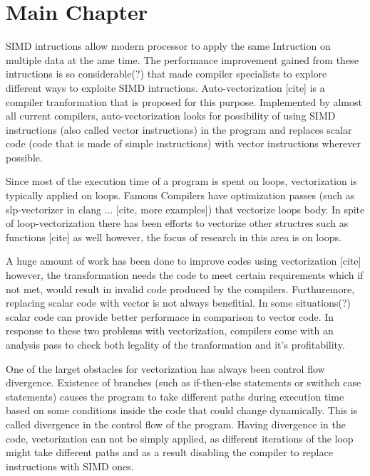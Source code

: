 \documentclass[\main/thesis.tex]{subfiles}
\begin{document}
\chapter{Main Chapter}

SIMD intructions allow modern processor to apply the same Intruction on multiple data at the ame time. The performance improvement gained from these intructions is 
so considerable(?) that made compiler specialists to explore different ways to exploite SIMD intructions. Auto-vectorization [cite] is a compiler tranformation that is proposed
for this purpose. Implemented by almost all current compilers, auto-vectorization looks for possibility of using SIMD instructions (also called vector instructions) in the program and replaces
scalar code (code that is made of simple instructions) with vector instructions wherever possible.

Since most of the execution time of a program is spent on loops, vectorization is typically applied on loops. Famous Compilers have optimization passes (such as slp-vectorizer in clang ... [cite, more examples])
that vectorize loops body. In spite of loop-vectorization there has been efforts to vectorize other structres such as functions [cite] as well however, the focus of research in this area is on loops.

A huge amount of work has been done to improve codes using vectorization [cite] however, the transformation needs the code to meet certain requirements which if not met, would result in invalid code
produced by the compilers. Furthuremore, replacing scalar code with vector is not always benefitial. In some situations(?) scalar code can provide better performace in comparison to vector code.
In response to these two problems with vectorization, compilers come with an analysis pass to check both legality of the tranformation and it's profitability.

One of the larget obstacles for vectorization has always been control flow divergence. Existence of branches (such as if-then-else statements or swithch case statements) causes the program to take different paths during execution time 
based on some conditions inside the code that could change dynamically. This is called divergence in the control flow of the program. Having divergence in the code, vectorization can not be simply applied,
as different iterations of the loop might take different paths and as a result disabling the compiler to replace instructions with SIMD ones. 
\end{document}
